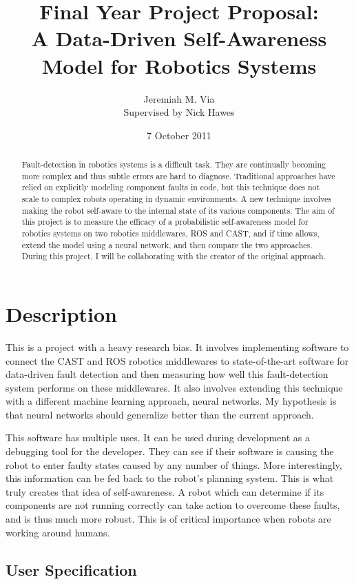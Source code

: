 \documentclass[10pt, a4paper]{article}
\title{
  {\small Final Year Project Proposal:}\\
  {A Data-Driven Self-Awareness Model for Robotics Systems}}
\author{
  Jeremiah M. Via \\ 
  \small{Supervised by Nick Hawes}}
\date{7 October 2011}
\begin{document}
\maketitle

\begin{abstract}
  Fault-detection in robotics systems is a difficult task. They are
  continually becoming more complex and thus subtle errors are hard to
  diagnose. Traditional approaches have relied on explicitly modeling
  component faults in code, but this technique does not scale to
  complex robots operating in dynamic environments. A new technique
  involves making the robot self-aware to the internal state of its
  various components. The aim of this project is to measure the
  efficacy of a probabilistic self-awareness model for robotics
  systems on two robotics middlewares, ROS and CAST, and if time
  allows, extend the model using a neural network, and then compare
  the two approaches. During this project, I will be collaborating
  with the creator of the original approach.
\end{abstract}


\section*{Description}

This is a project with a heavy research bias. It involves implementing
software to connect the CAST and ROS robotics middlewares to
state-of-the-art software for data-driven fault detection and then
measuring how well this fault-detection system performs on these
middlewares. It also involves extending this technique with a
different machine learning approach, neural networks. My hypothesis is
that neural networks should generalize better than the current
approach.

This software has multiple uses. It can be used during development as
a debugging tool for the developer. They can see if their software is
causing the robot to enter faulty states caused by any number of
things. More interestingly, this information can be fed back to the
robot's planning system. This is what truly creates that idea of
self-awareness. A robot which can determine if its components are not
running correctly can take action to overcome these faults, and is
thus much more robust. This is of critical importance when robots are
working around humans.

\subsection*{User Specification}
\end{document}

